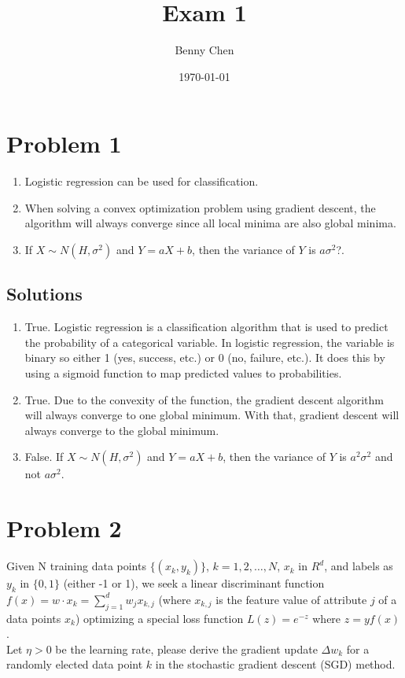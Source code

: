 \documentclass{article}
\title{Exam 1}
\author{Benny Chen}
\date{\today}
\begin{document}
\maketitle

\section*{Problem 1}

\begin{enumerate}
    \item Logistic regression can be used for classification.
    \item When solving a convex optimization problem using gradient descent, the algorithm will always converge since all local minima are also global minima.
    \item If $X \sim N(H, \sigma^2)$ and $Y = aX + b$, then the variance of $Y$ is $a\sigma^2$?.
\end{enumerate}

\subsection*{Solutions}

\begin{enumerate}
    \item True. Logistic regression is a classification algorithm that is used to predict the probability of a categorical variable. In logistic regression, the  variable is binary so either 1 (yes, success, etc.) or 0 (no, failure, etc.). It does this by using a sigmoid function to map predicted values to probabilities.
    \item True. Due to the convexity of the function, the gradient descent algorithm will always converge to one global minimum. With that, gradient descent will always converge to the global minimum.
    \item False. If $X \sim N(H, \sigma^2)$ and $Y = aX + b$, then the variance of $Y$ is $a^2\sigma^2$ and not $a\sigma^2$.
\end{enumerate}

\section*{Problem 2}

Given N training data points $\{(x_k,y_k)\}$, $k = 1,2,\ldots,N$, $x_k$ in $R^d$, and labels as $y_k$ in $\{0,1\}$ (either -1 or 1), we seek a linear discriminant function $f(x) = w \cdot x_k = \sum_{j=1}^{d} {w_j}{x_{k,j}}$ (where $x_{k,j}$ is the feature value of attribute $j$ of a data points $x_k$) optimizing a special loss function $L(z) = e^{-z}$ where $z = yf(x)$.
\\
Let $\eta > 0$ be the learning rate, please derive the gradient update $\Delta w_k$ for a randomly elected data point $k$ in the stochastic gradient descent (SGD) method.
\end{document}
